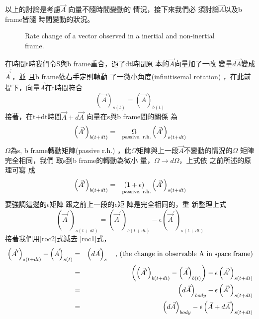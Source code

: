 \documentclass[12pt,twoside]{article}
\begin{document}
以上的討論是考慮$\vec{A}$%
向量不隨時間變動的%
情況，接下來我們必%
須討論$\vec{A}$以及b frame皆隨%
時間變動的狀況。

\bigskip 
\begin{figure}[th]
\caption{Rate change of a vector observed in a inertial and non-inertial
frame.}
\label{ratevecfig}
\begin{center}
\fbox{}
\end{center}
\end{figure}

\bigskip 在時間t時我們令S與b
frame重合，過了dt時間原%
本的$\vec{A}$向量加了一改%
變量$d\vec{A}$變成$\vec{A}^{\prime }$，並%
且b frame依右手定則轉動%
了一微小角度(infinitisemal rotation)%
，在此前提下，向量$%
\vec{A}$在t時間符合%
\begin{equation}
\left( \vec{A}\right) _{s(t)}=\left( \vec{A}\right) _{b(t)}  \label{roc1}
\end{equation}%
接著，在t+dt時間$\vec{A}+d\vec{A}$%
向量在s與b frame間的關係%
為%
\begin{equation*}
\left( \vec{A}^{\prime }\right) _{b(t+dt)}=\underset{\text{passive, r.h.}}{%
\Omega }\left( \vec{A}^{\prime }\right) _{s(t+dt)}
\end{equation*}%
$\Omega $為s, b frame轉動矩陣(passive r.h.)%
，此$\Omega $矩陣與上一段$%
\vec{A}$不變動的情況的$\Omega $%
矩陣完全相同，我們%
取s到b frame的轉動為微小%
量，$\Omega \rightarrow d\Omega $，上式依%
之前所述的原理可寫%
成%
\begin{equation*}
\left( \vec{A}^{\prime }\right) _{b(t+dt)}=\underset{\text{passive, r.h.}}{%
\left( 1+\epsilon \right) }\left( \vec{A}^{\prime }\right) _{s(t+dt)}
\end{equation*}%
要強調這邊的$\epsilon $矩陣%
跟之前上一段的$\epsilon $矩%
陣是完全相同的，重%
新整理上式%
\begin{equation}
\left( \vec{A}^{\prime }\right) _{s(t+dt)}=\left( \vec{A}^{\prime }\right)
_{b(t+dt)}-\epsilon \left( \vec{A}^{\prime }\right) _{s(t+dt)}  \label{roc2}
\end{equation}%
接著我們用\ref{roc2}式減去%
\ref{roc1}式，%
\begin{eqnarray}
\left( \vec{A}^{\prime }\right) _{s(t+dt)}-\left( \vec{A}\right) _{s(t)}
&=&\left( d\vec{A}\right) _{s}\text{ , (the change in observable A in space
frame)}  \notag \\
&=&\left( \left( \vec{A}^{\prime }\right) _{b(t+dt)}-\left( \vec{A}\right)
_{b(t)}\right) -\epsilon \left( \vec{A}^{\prime }\right) _{s(t+dt)}  \notag
\\
&=&\left( d\vec{A}\right) _{body}-\epsilon \left( \vec{A}^{\prime }\right)
_{s(t+dt)}  \notag \\
&=&\left( d\vec{A}\right) _{body}-\epsilon \left( \vec{A}+d\vec{A}\right)
_{s(t+dt)}  \label{roc4}
\end{eqnarray}%
\end{document}
